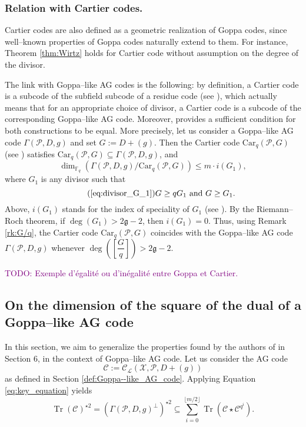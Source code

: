 \documentclass[a4paper]{amsart}
\theoremstyle{definition}
\theoremstyle{remark}
\newcommand{\calP}{\mathcal{P}}
\newcommand{\calL}{\mathcal{L}}
\newcommand{\calC}{\mathcal{C}}
\newcommand{\calX}{\mathcal{X}}
\newcommand{\fq}{\mathbb{F}_{q}}
\newcommand{\Tr}[1]{\operatorname{Tr}\left(#1\right)}
\newcommand\jade[1]{\textcolor{purple}{#1}}
\begin{document}
\subsubsection{Relation with Cartier codes.} Cartier codes \cite{Cou14} are also defined as a geometric realization of Goppa codes, since well--known properties of Goppa codes naturally extend to them. For instance, Theorem \ref{thm:Wirtz} holds for Cartier code without assumption on the degree of the divisor.

The link with Goppa--like AG codes is the following: by definition, a Cartier code is a subcode of the subfield subcode of a residue code (see \cite[Proposition 4.3]{Cou14}), which actually means that for an appropriate choice of divisor, a Cartier code is a subcode of the corresponding Goppa--like AG code. Moreover, \cite[Theorem 5.1]{Cou14} provides a sufficient condition for both constructions to be equal. More precisely, let us consider a Goppa--like AG code $\Gamma(\calP,D,g)$  and set $G := D+(g)$. Then the Cartier code $\mathrm{Car}_q(\calP,G)$ (see \cite[Definition 4.2]{Cou14}) satisfies $\mathrm{Car}_q(\calP,G) \subseteq \Gamma(\calP,D,g)$, and 
$$ \dim_{\fq} \left( \Gamma(\calP,D,g)/ \mathrm{Car}_q(\calP,G)\right) \leq m \cdot i(G_1),$$
where $G_1$ is any divisor such that 
\begin{equation} \tag{\ref{eq:divisor_G_1}}
G \geq qG_1 \ \mathrm{and} \ G \geq G_1.
\end{equation}
 Above, $i(G_1)$ stands for the index of speciality of $G_1$ (see \cite[Definition~1.6.10]{Sti09}). By the Riemann--Roch theorem, if $\deg(G_1) > 2\mathfrak{g}-2$, then $i(G_1) =0.$ 
Thus, using Remark \ref{rk:G/q}, the Cartier code $\mathrm{Car}_q(\calP,G)$ coincides with the Goppa--like AG code $\Gamma(\calP,D,g)$ whenever $\deg\left(\left[\dfrac{G}{q} \right]\right) > 2\mathfrak{g}-2$. 

\jade{TODO: Exemple d'égalité ou d'inégalité entre Goppa et Cartier.}

\subsection{On the dimension of the square of the dual of a Goppa--like AG code} \label{section:1st_improvement}
In this section, we aim to generalize the properties found by the authors of \cite{MT21} in Section 6, in the context of Goppa--like AG code. Let us consider the AG code 
$$\calC := \calC_{\calL}(\calX,\calP,D+(g))$$
as defined in Section \ref{def:Goppa--like_AG_code}. Applying Equation \eqref{eq:key_equation} yields   
\begin{equation} \label{eq:key_equation_Goppa--like} 
\Tr{\calC}^{\star 2} = (\Gamma(\calP,D,g)^{\perp})^{\star2} \subseteq \sum\limits_{i=0}^{\lfloor{m/2} \rfloor} \Tr{\calC\star \calC^{q^i}}.
\end{equation}
\end{document}
